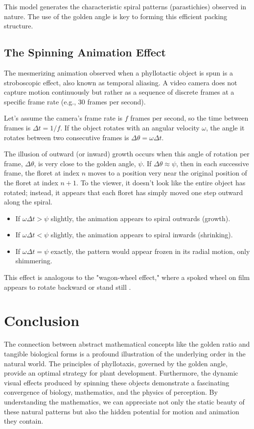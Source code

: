 \documentclass[12pt, a4paper]{article}
\begin{document}
This model generates the characteristic spiral patterns (parastichies) observed in nature. The use of the golden angle is key to forming this efficient packing structure.

\subsection{The Spinning Animation Effect}

The mesmerizing animation observed when a phyllotactic object is spun is a stroboscopic effect, also known as temporal aliasing. A video camera does not capture motion continuously but rather as a sequence of discrete frames at a specific frame rate (e.g., 30 frames per second).

Let's assume the camera's frame rate is $f$ frames per second, so the time between frames is $\Delta t = 1/f$. If the object rotates with an angular velocity $\omega$, the angle it rotates between two consecutive frames is $\Delta \theta = \omega \Delta t$.

The illusion of outward (or inward) growth occurs when this angle of rotation per frame, $\Delta \theta$, is very close to the golden angle, $\psi$.
If $\Delta \theta \approx \psi$, then in each successive frame, the floret at index $n$ moves to a position very near the original position of the floret at index $n+1$. To the viewer, it doesn't look like the entire object has rotated; instead, it appears that each floret has simply moved one step outward along the spiral.

\begin{itemize}
    \item If $\omega \Delta t > \psi$ slightly, the animation appears to spiral outwards (growth).
    \item If $\omega \Delta t < \psi$ slightly, the animation appears to spiral inwards (shrinking).
    \item If $\omega \Delta t = \psi$ exactly, the pattern would appear frozen in its radial motion, only shimmering.
\end{itemize}

This effect is analogous to the "wagon-wheel effect," where a spoked wheel on film appears to rotate backward or stand still \cite{Halliday2013}.

\section{Conclusion}

The connection between abstract mathematical concepts like the golden ratio and tangible biological forms is a profound illustration of the underlying order in the natural world. The principles of phyllotaxis, governed by the golden angle, provide an optimal strategy for plant development. Furthermore, the dynamic visual effects produced by spinning these objects demonstrate a fascinating convergence of biology, mathematics, and the physics of perception. By understanding the mathematics, we can appreciate not only the static beauty of these natural patterns but also the hidden potential for motion and animation they contain.
\end{document}
